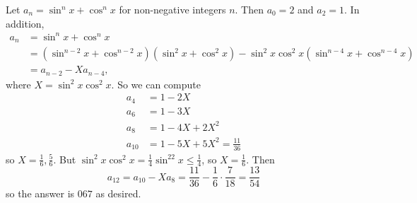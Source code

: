 Let $a_n=\sin^nx+\cos^nx$ for non-negative integers $n$. Then $a_0=2$ and $a_2=1$. In addition,
\begin{align*}
	a_n&=\sin^nx+\cos^nx\\
	&=\left(\sin^{n-2}x+\cos^{n-2}x\right)\left(\sin^2x+\cos^2x\right)-\sin^2x\cos^2x\left(\sin^{n-4}x+\cos^{n-4}x\right)\\
	&=a_{n-2}-Xa_{n-4},
\end{align*}
where $X=\sin^2x\cos^2x$. So we can compute
\begin{align*}
	a_4&=1-2X\\
	a_6&=1-3X\\
	a_8&=1-4X+2X^2\\
	a_{10}&=1-5X+5X^2=\frac{11}{36}
\end{align*}
so $X=\frac{1}{6},\frac{5}{6}$. But $\sin^2x\cos^2x=\frac{1}{4}\sin^22x\leq\frac{1}{4}$, so $X=\frac{1}{6}$. Then \[a_{12}=a_{10}-Xa_8=\frac{11}{36}-\frac{1}{6}\cdot\frac{7}{18}=\frac{13}{54}\] so the answer is $\boxed{067}$ as desired.